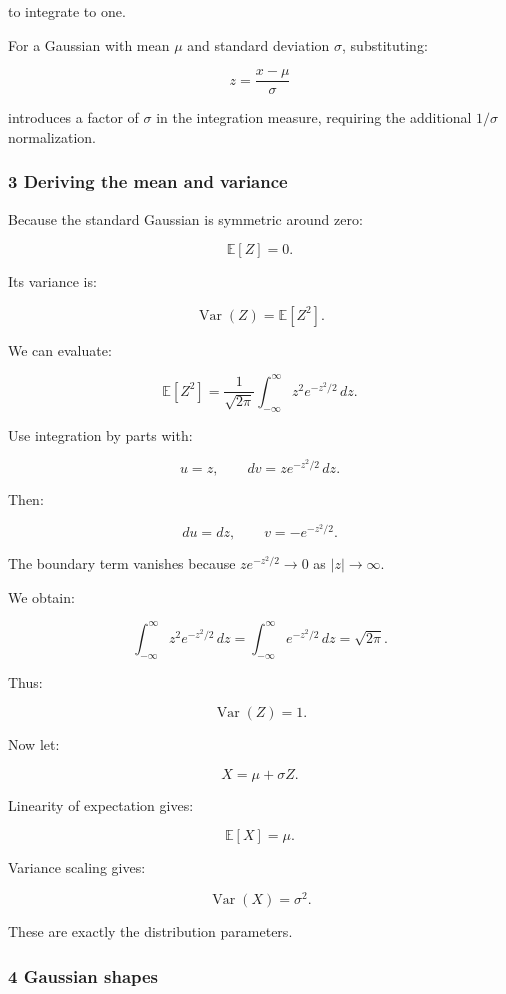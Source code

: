 to integrate to one.

For a Gaussian with mean \(\mu\) and standard deviation \(\sigma\), substituting:

\[
 z=\frac{x-\mu}{\sigma}
\]

introduces a factor of \(\sigma\) in the integration measure, requiring the additional \(1/\sigma\) normalization.

\subsubsection{3 Deriving the mean and variance}\label{02-foundations-ii-ch023-deriving-the-mean-and-variance}

\hypertarget{02-foundations-ii-ch023-deriving-the-mean-and-variance}{}

Because the standard Gaussian is symmetric around zero:

\[
 \mathbb E[Z]=0.
\]

Its variance is:

\[
 \operatorname{Var}(Z)=\mathbb E[Z^2].
\]

We can evaluate:

\[
 \mathbb E[Z^2] = \frac1{\sqrt{2\pi}} \int_{-\infty}^{\infty}z^2e^{-z^2/2}\,dz.
\]

Use integration by parts with:

\[
 u=z,\qquad dv=ze^{-z^2/2}\,dz.
\]

Then:

\[
 du=dz, \qquad v=-e^{-z^2/2}.
\]

The boundary term vanishes because \(ze^{-z^2/2}\to0\) as \(|z|\to\infty\).

We obtain:

\[
 \int_{-\infty}^{\infty}z^2e^{-z^2/2}\,dz = \int_{-\infty}^{\infty}e^{-z^2/2}\,dz =\sqrt{2\pi}.
\]

Thus:

\[
 \boxed{\operatorname{Var}(Z)=1}.
\]

Now let:

\[
 X=\mu+\sigma Z.
\]

Linearity of expectation gives:

\[
 \mathbb E[X]=\mu.
\]

Variance scaling gives:

\[
 \operatorname{Var}(X)=\sigma^2.
\]

These are exactly the distribution parameters.

\subsubsection{4 Gaussian shapes}\label{02-foundations-ii-ch023-gaussian-shapes}

